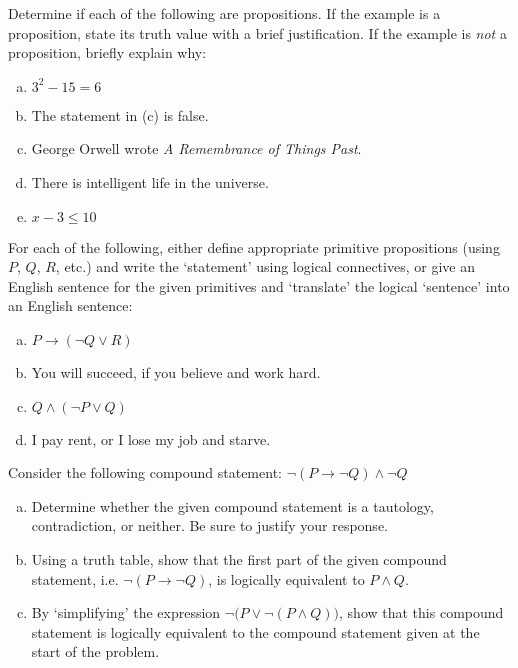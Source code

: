 \documentclass[11pt,letterpaper]{article}
\begin{document}

 Determine if each of the following are propositions. If the example is a proposition, state its truth value with a brief justification. If the example is \textit{not} a proposition, briefly explain why:
	\begin{enumerate}[(a)]
	\item $3^2 - 15= 6$
	\item The statement in (c) is false. 
	\item George Orwell wrote \textit{A Remembrance of Things Past}. 
	\item There is intelligent life in the universe.  
	\item $x - 3 \leq 10$
	\end{enumerate}



\newpage



 For each of the following, either define appropriate primitive propositions (using $P$, $Q$, $R$, etc.) and write the `statement' using logical connectives, or give an English sentence for the given primitives and `translate' the logical `sentence' into an English sentence:
	\begin{enumerate}[(a)]
	\item $P \to (\neg Q \vee R)$
	\item You will succeed, if you believe and work hard. 
	\item $Q \wedge (\neg P \vee Q)$
	\item I pay rent, or I lose my job and starve. 
	\end{enumerate}



\newpage



 Consider the following compound statement: $\neg (P \to \neg Q) \wedge \neg Q$
	\begin{enumerate}[(a)]
	\item Determine whether the given compound statement is a tautology, contradiction, or neither. Be sure to justify your response. 
	\item Using a truth table, show that the first part of the given compound statement, i.e. $\neg (P \to \neg Q)$, is logically equivalent to $P \wedge Q$. 
	\item By `simplifying' the expression $\neg \big(P \vee \neg (P \wedge Q) \big)$, show that this compound statement is logically equivalent to the compound statement given at the start of the problem.
	\end{enumerate}
\end{document}
